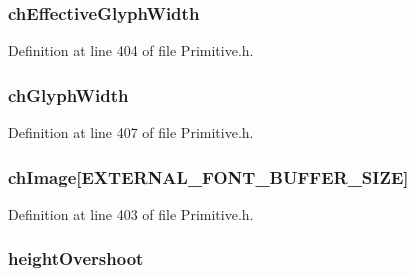 \subsubsection[{ch\+Effective\+Glyph\+Width}]{ ch\+Effective\+Glyph\+Width}\label{struct_o_u_t_c_h_a_r___p_a_r_a_m_a11dc54b7351d032f72bd9b5eaf8382ee}


Definition at line 404 of file Primitive.\+h.

\hypertarget{struct_o_u_t_c_h_a_r___p_a_r_a_m_a09dc0bee13d894a4ad76766cd6cb5a8d}{}
\subsubsection[{ch\+Glyph\+Width}]{ ch\+Glyph\+Width}\label{struct_o_u_t_c_h_a_r___p_a_r_a_m_a09dc0bee13d894a4ad76766cd6cb5a8d}


Definition at line 407 of file Primitive.\+h.

\hypertarget{struct_o_u_t_c_h_a_r___p_a_r_a_m_a3259697931fac636c111e8f7ea1e05c0}{}
\subsubsection[{ch\+Image}]{ ch\+Image\mbox{[}E\+X\+T\+E\+R\+N\+A\+L\+\_\+\+F\+O\+N\+T\+\_\+\+B\+U\+F\+F\+E\+R\+\_\+\+S\+I\+Z\+E\mbox{]}}\label{struct_o_u_t_c_h_a_r___p_a_r_a_m_a3259697931fac636c111e8f7ea1e05c0}


Definition at line 403 of file Primitive.\+h.

\hypertarget{struct_o_u_t_c_h_a_r___p_a_r_a_m_a03244b58902ce255eb3894328c3e0b92}{}
\subsubsection[{height\+Overshoot}]{ height\+Overshoot}\label{struct_o_u_t_c_h_a_r___p_a_r_a_m_a03244b58902ce255eb3894328c3e0b92}


